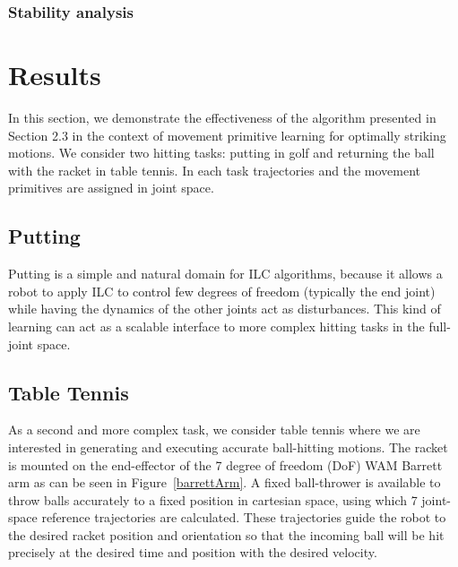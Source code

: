 \documentclass[10pt,a4paper]{article}
\begin{document}
\subsubsection{Stability analysis}

\section{Results}\label{results}

In this section, we demonstrate the effectiveness of the algorithm presented in Section 2.3 in the context of movement primitive learning for optimally striking motions. We consider two hitting tasks: putting in golf and returning the ball with the racket in table tennis. In each task trajectories and the movement primitives are assigned in joint space. 

\subsection{Putting}

Putting is a simple and natural domain for ILC algorithms, because it allows a robot to apply ILC to control few degrees of freedom (typically the end joint) while having the dynamics of the other joints act as disturbances. This kind of learning can act as a scalable interface to more complex hitting tasks in the full-joint space.

\subsection{Table Tennis}

As a second and more complex task, we consider table tennis where we are interested in generating and executing accurate ball-hitting motions. The racket is mounted on the end-effector of the 7 degree of freedom (DoF) WAM Barrett arm as can be seen in Figure~\ref{barrettArm}. A fixed ball-thrower is available to throw balls accurately to a fixed position in cartesian space, using which 7 joint-space reference trajectories are calculated. These trajectories guide the robot to the desired racket position and orientation so that the incoming ball will be hit precisely at the desired time and position with the desired velocity. 
\end{document}
